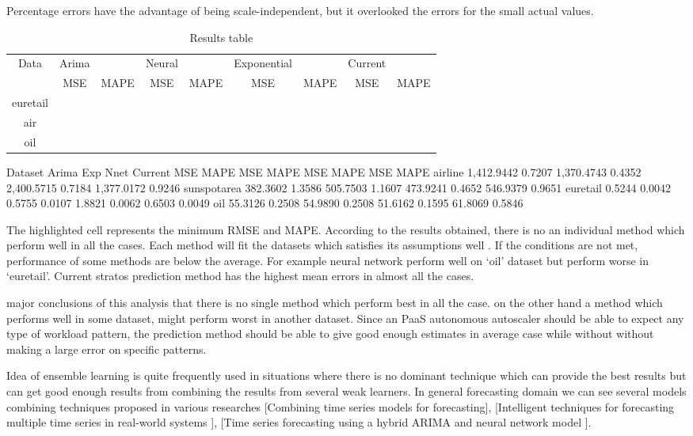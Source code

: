 Percentage errors have the advantage of being scale-independent, but it overlooked the errors for the small actual values.




\begin{table} 
    \begin{tabular}{ c c c c c c c c c }
        Data & Arima &  & Neural &  & Exponential &  & Current &  \\ 
         & MSE & MAPE & MSE & MAPE & MSE & MAPE & MSE & MAPE \\ 
        euretail &  &  &  &  &  &  &  &  \\ 
        air &  &  &  &  &  &  &  &  \\ 
        oil &  &  &  &  &  &  &  &  \\ 
    \end{tabular} 
    \caption{Results table} 
\end{table}

Dataset
Arima
Exp
Nnet
Current
MSE
MAPE
MSE
MAPE
MSE
MAPE
MSE
MAPE
airline
1,412.9442
0.7207
1,370.4743
0.4352
2,400.5715
0.7184
1,377.0172
0.9246
sunspotarea
382.3602
1.3586
505.7503
1.1607
473.9241
0.4652
546.9379
0.9651
euretail
0.5244
0.0042
0.5755
0.0107
1.8821
0.0062
0.6503
0.0049
oil
55.3126
0.2508
54.9890
0.2508
51.6162
0.1595
61.8069
0.5846

The highlighted cell represents the minimum RMSE and MAPE. According to the results obtained, there is no an individual method which perform well in all the cases. Each method will fit the datasets which satisfies its assumptions well . If the conditions are not met, performance of some methods are below the average. For example neural network perform well on ‘oil’ dataset but perform worse in ‘euretail’.  Current stratos prediction method has the highest mean errors in almost all the cases.

major conclusions of this analysis that there is no single method which perform best in all the case. on the other hand a method which performs well in some dataset, might perform worst in another dataset.
Since an PaaS autonomous autoscaler should be able to expect any type of workload pattern, the prediction method should be able to give good enough estimates in average case while without without making a large error on specific patterns.

Idea of ensemble learning is quite frequently used in situations where there is no dominant technique which can provide the best results but can get good enough results from combining the results from several weak learners. In general forecasting domain we can see several models combining techniques  proposed in various researches [Combining time series models for forecasting], [Intelligent techniques for forecasting multiple time series in real-world systems ],
[Time series forecasting using a hybrid ARIMA and neural network model ].  

